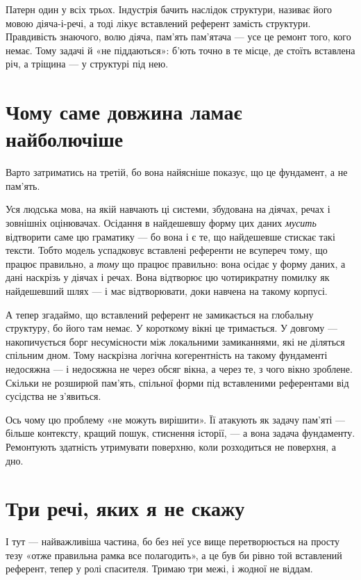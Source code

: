 \documentclass[12pt, a4paper, openany]{book}
\begin{document}
Патерн один у всіх трьох. Індустрія бачить наслідок структури, називає його мовою діяча-і-речі, а тоді лікує вставлений референт замість структури. Правдивість знаючого, волю діяча, пам'ять пам'ятача --- усе це ремонт того, кого немає. Тому задачі й «не піддаються»: б'ють точно в те місце, де стоїть вставлена річ, а тріщина --- у структурі під нею.

\section{Чому саме довжина ламає найболючіше}

Варто затриматись на третій, бо вона найясніше показує, що це фундамент, а не пам'ять.

Уся людська мова, на якій навчають ці системи, збудована на діячах, речах і зовнішніх оцінювачах. Осідання в найдешевшу форму цих даних \emph{мусить} відтворити саме цю граматику --- бо вона і є те, що найдешевше стискає такі тексти. Тобто модель успадковує вставлені референти не всупереч тому, що працює правильно, а \emph{тому} що працює правильно: вона осідає у форму даних, а дані наскрізь у діячах і речах. Вона відтворює цю чотирикратну помилку як найдешевший шлях --- і має відтворювати, доки навчена на такому корпусі.

А тепер згадаймо, що вставлений референт не замикається на глобальну структуру, бо його там немає. У короткому вікні це тримається. У довгому --- накопичується борг несумісности між локальними замиканнями, які не діляться спільним дном. Тому наскрізна логічна когерентність на такому фундаменті недосяжна --- і недосяжна не через обсяг вікна, а через те, з чого вікно зроблене. Скільки не розширюй пам'ять, спільної форми під вставленими референтами від сусідства не з'явиться.

Ось чому цю проблему «не можуть вирішити». Її атакують як задачу пам'яті --- більше контексту, кращий пошук, стиснення історії, --- а вона задача фундаменту. Ремонтують здатність утримувати поверхню, коли розходиться не поверхня, а дно.

\section{Три речі, яких я не скажу}

І тут --- найважливіша частина, бо без неї усе вище перетворюється на просту тезу «отже правильна рамка все полагодить», а це був би рівно той вставлений референт, тепер у ролі спасителя. Тримаю три межі, і жодної не віддам.
\end{document}
